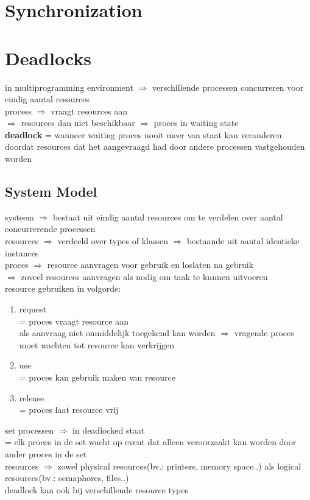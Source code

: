 \documentclass{report}
\begin{document}
\chapter{Synchronization}
\chapter{Deadlocks}
in multiprogramming environment $\Rightarrow$ verschillende processen concurreren voor eindig aantal resources
\\process $\Rightarrow$ vraagt resources aan
\\$\Rightarrow$ resources dan niet beschikbaar $\Rightarrow$ proces in waiting state
\\\textbf{deadlock} = wanneer waiting proces nooit meer van staat kan veranderen doordat resources dat het aangevraagd had  door andere processen vastgehouden worden
\section{System Model}
systeem $\Rightarrow$ bestaat uit eindig aantal resources om te verdelen over aantal concurrerende processen
\\resources $\Rightarrow$ verdeeld over types of klassen $\Rightarrow$ bestaande uit aantal identieke instances
\\proces $\Rightarrow$ resource aanvragen voor gebruik en loslaten na gebruik
\\$\Rightarrow$ zoveel resources aanvragen als nodig om taak te kunnen uitvoeren
\\resource gebruiken in volgorde:
\begin{enumerate}
\item request
\\= proces vraagt resource aan 
\\als aanvraag niet onmiddelijk toegekend kan worden $\Rightarrow$ vragende proces moet wachten tot resource kan verkrijgen
\item use
\\= proces kan gebruik maken van resource
\item release
\\= proces laat resource vrij
\end{enumerate}
set processen $\Rightarrow$ in deadlocked staat 
\\= elk proces in de set wacht op event dat alleen veroorzaakt kan worden door ander proces in de set
\\resources $\Rightarrow$ zowel physical resources(bv.: printers, memory space..) als logical resources(bv.: semaphores, files..)
\\deadlock kan ook bij verschillende resource types
\end{document}
